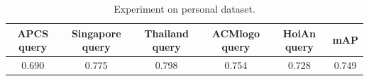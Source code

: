 \begin{table}[h!]
  \centering
  \label{tab:detail_result}
  \begin{tabular}{cccccc}
    \toprule
    APCS query & Singapore query & Thailand query & ACMlogo query & HoiAn query & mAP \\
    \midrule
    0.690 & 0.775 & 0.798 & 0.754 & 0.728 & 0.749 \\
    \bottomrule
  \end{tabular}
  \caption{Experiment on personal dataset.}
\end{table}